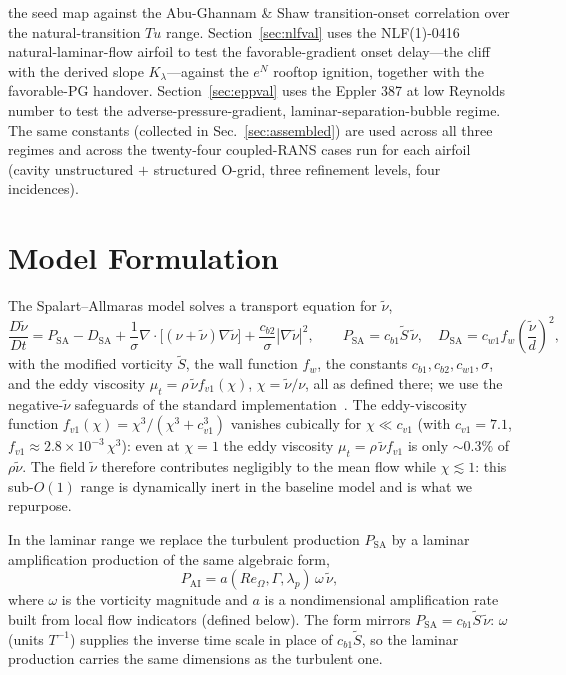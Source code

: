 \documentclass[journal]{new-aiaa}
\begin{document}
the seed map against the Abu-Ghannam \& Shaw transition-onset correlation over
the natural-transition $Tu$ range.
Section~\ref{sec:nlfval} uses the NLF(1)-0416 natural-laminar-flow airfoil to
test the favorable-gradient onset delay---the cliff with the derived slope
$K_\lambda$---against the $e^N$ rooftop ignition, together with the
favorable-PG handover.
Section~\ref{sec:eppval} uses the Eppler 387 at low Reynolds number to test the
adverse-pressure-gradient, laminar-separation-bubble regime. The same
constants (collected in Sec.~\ref{sec:assembled}) are used across all three
regimes and across the twenty-four coupled-RANS cases run for each airfoil
(cavity unstructured $+$ structured O-grid, three refinement levels, four
incidences).

\section{Model Formulation}\label{sec:model}

The Spalart--Allmaras model \cite{spalart_allmaras_1992} solves a transport equation
for $\tilde\nu$,
\begin{equation}
  \frac{D\tilde\nu}{Dt} = P_\mathrm{SA} - D_\mathrm{SA}
  + \frac{1}{\sigma}\nabla\!\cdot\!\big[(\nu+\tilde\nu)\nabla\tilde\nu\big]
  + \frac{c_{b2}}{\sigma}|\nabla\tilde\nu|^2,
  \qquad
  P_\mathrm{SA} = c_{b1}\tilde S\,\tilde\nu,
  \quad
  D_\mathrm{SA} = c_{w1}f_w\!\left(\frac{\tilde\nu}{d}\right)^{\!2},
  \label{eq:sa}
\end{equation}
with the modified
vorticity $\tilde S$, the wall function $f_w$, the constants $c_{b1},c_{b2},c_{w1},
\sigma$, and the eddy viscosity $\mu_t=\rho\,\tilde\nu f_{v1}(\chi)$,
$\chi=\tilde\nu/\nu$, all as defined there; we use the negative-$\tilde\nu$
safeguards of the standard implementation~\cite{allmaras_2012}. The eddy-viscosity function
$f_{v1}(\chi)\!=\!\chi^3/(\chi^3+c_{v1}^3)$ vanishes cubically for
$\chi\!\ll\!c_{v1}$ (with $c_{v1}\!=\!7.1$,
$f_{v1}\!\approx\!2.8\!\times\!10^{-3}\,\chi^3$): even at $\chi\!=\!1$ the
eddy viscosity $\mu_t\!=\!\rho\,\tilde\nu f_{v1}$ is only $\sim\!0.3\%$ of
$\rho\tilde\nu$. The field $\tilde\nu$
therefore contributes negligibly to the mean flow while $\chi\lesssim1$: this
sub-$O(1)$ range is dynamically inert in the baseline model and is what we
repurpose.

In the laminar range we replace the turbulent production $P_\mathrm{SA}$ by a
laminar amplification production of the same algebraic form,
\begin{equation}
  P_\mathrm{AI} = a(Re_\Omega,\Gamma,\lambda_p)\,\omega\,\tilde\nu ,
  \label{eq:pai}
\end{equation}
where $\omega$ is the vorticity magnitude and $a$ is a nondimensional
amplification rate built from local flow indicators (defined below). The form
mirrors $P_\mathrm{SA}=c_{b1}\tilde S\,\tilde\nu$: $\omega$ (units $T^{-1}$)
supplies the inverse time scale in place of $c_{b1}\tilde S$, so the laminar
production carries the same dimensions as the turbulent one.
\end{document}
